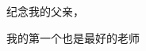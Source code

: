 \newpage
\vspace*{\fill}
    \begin{center}
        纪念我的父亲，

        我的第一个也是最好的老师
    \end{center}
\vspace*{\fill}
\newpage
